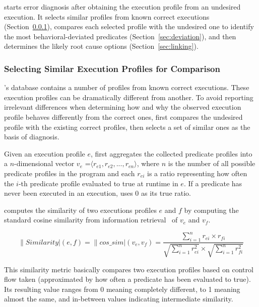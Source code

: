 \ourtool starts error diagnosis after obtaining the execution profile from
an undesired execution. It selects similar
profiles from known correct executions (Section~\ref{sec:similar}), compares
each selected profile with
the undesired one to identify the most behavioral-deviated predicates
(Section~\ref{sec:deviation}), and then determines
the likely root cause options (Section~\ref{sec:linking}).


\subsubsection{Selecting Similar Execution Profiles for Comparison}
\label{sec:similar}

\ourtool's database contains a number of
profiles from known correct executions.  These execution profiles 
can be dramatically different from another.  To avoid reporting irrelevant
differences when 
determining how and why the observed execution profile behaves
differently from the correct ones, \ourtool first
compares the undesired profile with the existing
correct profiles, then selects a set of similar ones
as the basis of diagnosis.

Given an execution profile $e$, \ourtool first aggregates
the collected predicate profiles into a $n$-dimensional
vector $v_e$ =$\langle r_{e1}, r_{e2}, ..., r_{en}\rangle$, where $n$
is the number of all possible predicate profiles in the program
and each $r_{ei}$ is a ratio representing how often the $i$-th predicate
profile evaluated to true at runtime in $e$.
If a predicate has never been executed in an execution,
\ourtool uses 0 as its true ratio. %

\ourtool computes the similarity of two executions profiles $e$ and $f$
by computing the standard cosine similarity from information retrieval~\cite{Witten96managinggigabytes}
of $v_{e}$ and $v_{f}$.

\vspace{-2mm}

{\small{
\[
\|Similarity|(e, f) = \|cos\_sim|(v_{e}, v_{f}) = \frac{\sum_{i = 1}^{n}r_{ei} \times r_{fi}}
{\sqrt{\sum_{i = 1}^{n}r_{ei}^2} \times \sqrt{\sum_{i = 1}^{n}r_{fi}^2}}
\]
}}

\vspace{-2mm}

This similarity metric basically compares two execution profiles based on
 control flow taken (approximated by how often a predicate has been evaluated to
true). Its resulting value ranges from 0 meaning completely different, to 1 meaning almost the same, 
and in-between values indicating intermediate similarity.


